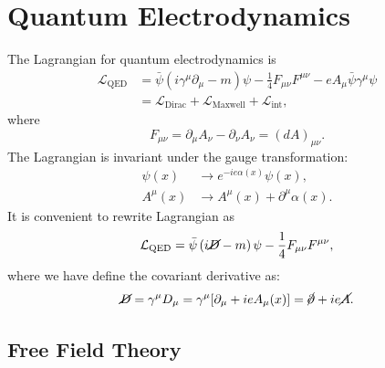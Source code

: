 \chapter{Quantum Electrodynamics}

The Lagrangian for quantum electrodynamics is
\begin{equation}
\begin{aligned}
	\mathcal{L}_{\mathrm{QED}}
	&= \bar\psi \left(i\gamma^\mu \partial_\mu - m\right)\psi - \frac{1}{4}F_{\mu\nu}F^{\mu\nu} -eA_\mu \bar\psi\gamma^\mu  \psi \\
	&= \mathcal{L}_{\mathrm{Dirac}}+\mathcal{L}_{\mathrm{Maxwell}}+\mathcal{L}_{\mathrm{int}},
\end{aligned}
\end{equation}
where
\begin{equation}
	F_{\mu\nu} = \partial_\mu A_\nu - \partial_\nu A_\nu = (dA)_{\mu\nu}.
\end{equation}
The Lagrangian is invariant under the gauge transformation:
\begin{equation}
\begin{aligned}
	\psi(x) &\rightarrow e^{-ie\alpha(x)}\psi(x), \\
	A^\mu(x) &\rightarrow A^\mu(x) + \partial^\mu \alpha(x).
\end{aligned}
\end{equation}
It is convenient to rewrite Lagrangian as
\begin{equation}
	\mathcal{L}_{\mathrm{QED}}
	= \bar\psi \left(i\cancel{D} - m\right)\psi - \frac{1}{4}F_{\mu\nu}F^{\mu\nu},
\end{equation}
where we have define the covariant derivative as:
\begin{equation}
	\cancel{D} = \gamma^\mu D_\mu 
	= \gamma^\mu [\partial_\mu + i e A_\mu(x)]
	= \cancel{\partial} + ie \cancel{A}.
\end{equation}


\section{Free Field Theory}

